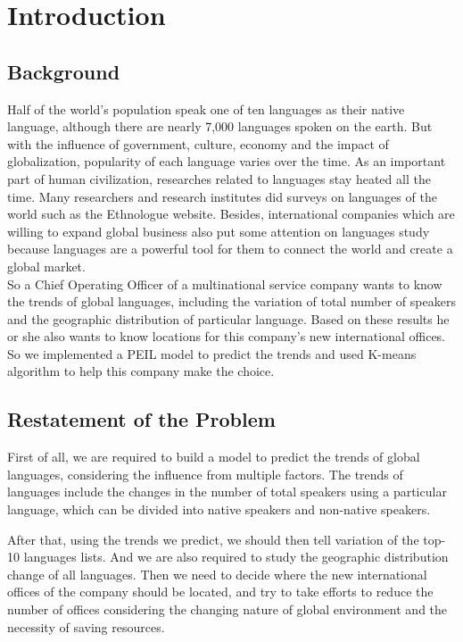 \documentclass{mcmthesis}
\begin{document}
  \section{Introduction}
  \subsection{Background}
    \indent \indent Half of the world's population speak one of ten languages as their native language, although there are nearly 7,000 languages spoken on the earth. But with the influence of government, culture, economy and the impact of globalization, popularity of each language varies over the time. As an important part of human civilization, researches related to languages stay heated all the time. Many researchers and research institutes did surveys on languages of the world such as the Ethnologue website. Besides, international companies which are willing to expand global business also put some attention on languages study because languages are a powerful tool for them to connect the world and create a global market. \\
    \indent So a Chief Operating Officer of a multinational service company wants to know the trends of global languages, including the variation of total number of speakers and the geographic distribution of particular language. Based on these results he or she also wants to know locations for this company's new international offices. So we implemented a PEIL model to predict the trends and used K-means algorithm to help this company make the choice.
  \subsection{Restatement of the Problem}
    \indent \indent First of all, we are required to build a model to predict the trends of global languages, considering the influence from multiple factors. The trends of languages include the changes in the number of total speakers using a particular language, which can be divided into native speakers and non-native speakers. 
    
    \indent After that, using the trends we predict, we should then tell variation of the top-10 languages lists. And we are also required to study the geographic distribution change of all languages. Then we need to decide where the new international offices of the company should be located, and try to take efforts to reduce the number of offices considering the changing nature of global environment and the necessity of saving resources.
\end{document}

